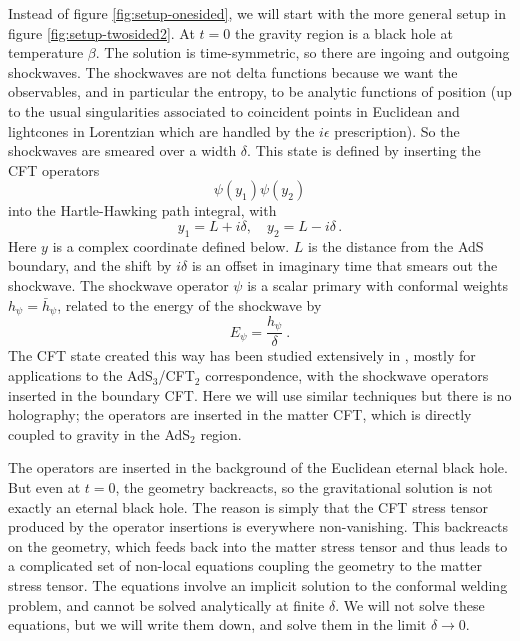 \documentclass[12pt]{article}
\newcommand{\be}{\begin{equation}}
\newcommand{\ee}{\end{equation}}
\def\be{\begin{eqnarray}}
\def\ee{\end{eqnarray}}
\def\be{\begin{equation}}
\def\ee{\end{equation}}
\numberwithin{equation}{section}
\def\d{{\delta}}
\def\be{\begin{equation}}
\def\ee{\end{equation}}
\def\q{\quad}
\def \be {\begin{equation}}
\def \ee {\end{equation}}
\newcommand{\bh}{\bar{h}}
\begin{document}
\begin{spacing}{1.1}
Instead of figure \ref{fig:setup-onesided}, we will start with the more general setup in figure \ref{fig:setup-twosided2}. At $t=0$ the gravity region is a black hole at temperature $\beta$. The solution is time-symmetric, so there are ingoing and outgoing shockwaves. The shockwaves are not delta functions because we want the observables, and in particular the entropy, to be analytic functions of position (up to the usual singularities associated to coincident points in Euclidean and lightcones in Lorentzian which are handled by the $i\epsilon$ prescription). So the shockwaves are smeared over a width $\delta$. This  state is defined by inserting the CFT operators
\be
\psi(y_1) \psi(y_2)
\ee
into the Hartle-Hawking path integral, with
\be
y_1 =L+i\d,\q  y_2 = L-i\d\, .
\ee
Here $y$ is a complex coordinate defined below. $L$ is the distance from the AdS boundary, and the shift by $i\delta$ is an offset in imaginary time that smears out the shockwave.
The shockwave operator $\psi$ is a scalar primary with conformal weights $h_\psi = \bh_\psi$, related to the energy of the shockwave by
\be
E_\psi =  \frac{h_\psi}{\delta} \ .
\ee
The CFT state created this way has been studied extensively in \cite{Nozaki:2014hna,Asplund:2014coa,Roberts:2014ifa,Hartman:2015lfa,Caputa:2015waa,Anous:2016kss,Afkhami-Jeddi:2017rmx}, mostly for applications to the AdS$_3$/CFT$_2$ correspondence, with the shockwave operators inserted in the boundary CFT. Here we will use similar techniques but there is no holography; the operators are inserted in the matter CFT, which is directly coupled to gravity in the AdS$_2$ region.

The operators are inserted in the background of the Euclidean eternal black hole. But even at $t=0$, the geometry backreacts, so the gravitational solution is not exactly an eternal black hole. The reason is simply that the CFT stress tensor produced by the operator insertions is everywhere non-vanishing. This backreacts on the geometry, which feeds back into the matter stress tensor and thus leads to a complicated set of non-local equations coupling the geometry to the matter stress tensor. The equations involve an implicit solution to the conformal welding problem, and cannot be solved analytically at finite $\delta$. We will not solve these equations, but we will write them down, and solve them in the limit $\delta \to 0$.


\end{spacing}
\end{document}
